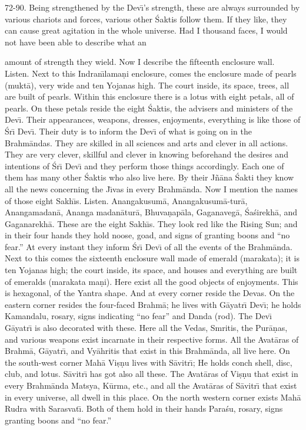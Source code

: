 72-90. Being strengthened by the Dev\={\i}'s strength, these are always surrounded by various chariots and forces, various other \'Saktis follow them. If they like, they can cause great agitation in the whole universe. Had I thousand faces, I would not have been able to describe what an

amount of strength they wield. Now I describe the fifteenth enclosure wall. Listen. Next to this Indran\={\i}lama\d{n}i enclosure, comes the enclosure made of pearls (mukt\=a), very wide and ten Yojanas high. The court inside, its space, trees, all are built of pearls. Within this enclosure there is a lotus with eight petals, all of pearls. On these petals reside the eight \'Saktis, the advisers and ministers of the Dev\={\i}. Their appearances, weapons, dresses, enjoyments, everything is like those of \'Sr\={\i} Dev\={\i}. Their duty is to inform the Dev\={\i} of what is going on in the Brahm\=andas. They are skilled in all sciences and arts and clever in all actions. They are very clever, skillful and clever in knowing beforehand the desires and intentions of \'Sr\={\i} Dev\={\i} and they perform those things accordingly. Each one of them has many other \'Saktis who also live here. By their J\~n\=ana \'Sakti they know all the news concerning the J\={\i}vas in every Brahm\=anda. Now I mention the names of those eight Sakh\={\i}s. Listen. Anangakusum\=a, Anangakusum\=a-tur\=a, Anangamadan\=a, Ananga madan\=atur\=a, Bhuva\d{n}ap\=ala, Gaganaveg\=a, \'Sa\'sirekh\=a, and Gaganarekh\=a. These are the eight Sakh\={\i}s. They look red like the Rising Sun; and in their four hands they hold noose, goad, and signs of granting boons and ``no fear.'' At every instant they inform \'Sr\={\i} Dev\={\i} of all the events of the Brahm\=anda. Next to this comes the sixteenth enclosure wall made of emerald (marakata); it is ten Yojanas high; the court inside, its space, and houses and everything are built of emeralds (marakata ma\d{n}i). Here exist all the good objects of enjoyments. This is hexagonal, of the Yantra shape. And at every corner reside the Devas. On the eastern corner resides the four-faced Brahm\=a; he lives with G\=ayatr\={\i} Dev\={\i}; he holds Kamandalu, rosary, signs indicating ``no fear'' and Danda (rod). The Dev\={\i} G\=ayatr\={\i} is also decorated with these. Here all the Vedas, Smritis, the Pur\=a\d{n}as, and various weapons exist incarnate in their respective forms. All the Avat\=aras of Brahm\=a, G\=ayatr\={\i}, and Vy\=ahritis that exist in this Brahm\=anda, all live here. On the south-west corner Mah\=a Vi\d{s}\d{n}u lives with S\=avitr\={\i}; He holds conch shell, disc, club, and lotus. S\=avitr\={\i} has got also all these. The Avat\=aras of Vi\d{s}\d{n}u that exist in every Brahm\=anda Matsya, K\=urma, etc., and all the Avat\=aras of S\=avitr\={\i} that exist in every universe, all dwell in this place. On the north western corner exists Mah\=a Rudra with Sarasvat\={\i}. Both of them hold in their hands Para\'su, rosary, signs granting boons and ``no fear.''

